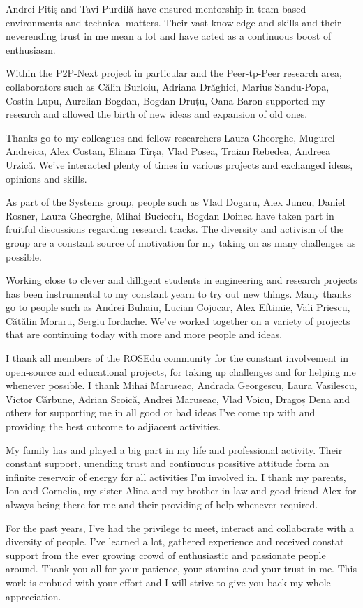 Andrei Pitiș and Tavi Purdilă have ensured mentorship in team-based
environments and technical matters. Their vast knowledge and skills and their
neverending trust in me mean a lot and have acted as a continuous boost of
enthusiasm.

Within the P2P-Next project in particular and the Peer-tp-Peer research area,
collaborators such as Călin Burloiu, Adriana Drăghici, Marius Sandu-Popa,
Costin Lupu, Aurelian Bogdan, Bogdan Druțu, Oana Baron supported my research
and allowed the birth of new ideas and expansion of old ones.

Thanks go to my colleagues and fellow researchers Laura Gheorghe, Mugurel
Andreica, Alex Costan, Eliana Tîrșa, Vlad Posea, Traian Rebedea, Andreea
Urzică. We've interacted plenty of times in various projects and exchanged
ideas, opinions and skills.

As part of the Systems group, people such as Vlad Dogaru, Alex Juncu, Daniel
Rosner, Laura Gheorghe, Mihai Bucicoiu, Bogdan Doinea have taken part in
fruitful discussions regarding research tracks. The diversity and activism of
the group are a constant source of motivation for my taking on as many
challenges as possible.

Working close to clever and dilligent students in engineering and research
projects has been instrumental to my constant yearn to try out new things.
Many thanks go to people such as Andrei Buhaiu, Lucian Cojocar, Alex Eftimie,
Vali Priescu, Cătălin Moraru, Sergiu Iordache. We've worked together on a
variety of projects that are continuing today with more and more people and
ideas.

I thank all members of the ROSEdu community for the constant involvement in
open-source and educational projects, for taking up challenges and for helping
me whenever possible. I thank Mihai Maruseac, Andrada Georgescu, Laura
Vasilescu, Victor Cărbune, Adrian Scoică, Andrei Maruseac, Vlad Voicu, Dragoș
Dena and others for supporting me in all good or bad ideas I've come up with
and providing the best outcome to adjiacent activities.

My family has and played a big part in my life and professional activity.
Their constant support, unending trust and continuous possitive attitude form
an infinite reservoir of energy for all activities I'm involved in. I thank my
parents, Ion and Cornelia, my sister Alina and my brother-in-law and good
friend Alex for always being there for me and their providing of help whenever
required.

For the past years, I've had the privilege to meet, interact and collaborate
with a diversity of people. I've learned a lot, gathered experience and
received constat support from the ever growing crowd of enthusiastic and
passionate people around. Thank you all for your patience, your stamina and
your trust in me. This work is embued with your effort and I will strive to
give you back my whole appreciation.
